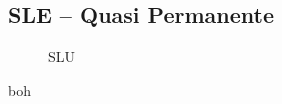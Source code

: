 \clearpage	
\begin{landscape}
\subsection*{SLE -- Quasi Permanente}
\begin{figure}[H]
\centering
{} 
\caption{SLU}
\label{fig:Momenti_SLSquasiPermanent}
\end{figure}
\begin{table}[H]
\centering
\caption{boh}
	\begin{tabular}{lS[table-format=3.2]S[table-format=3.2]S[table-format=3.2]S[table-format=3.2]S[table-format=3.2]S[table-format=3.2]S[table-format=3.2]S[table-format=3.2]S[table-format=3.2]S[table-format=3.2]S[table-format=3.2]S[table-format=3.2]S[table-format=3.2]}

\end{tabular}
\end{table}
\end{landscape}
